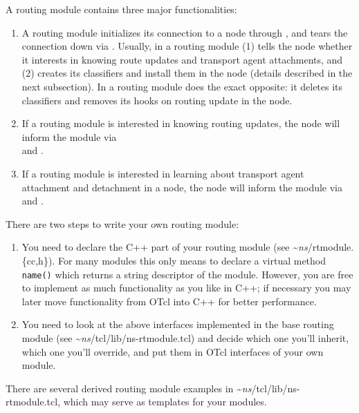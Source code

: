 A routing module contains three major functionalities:
\begin{enumerate}
\item %
  A routing module initializes its connection to a node through
  , and tears the connection down via
  .
  Usually, in  a routing module (1) tells the node
  whether it
  interests in knowing route updates and transport agent attachments,
  and (2) creates its classifiers and install them in the node
  (details described in the next subsection).
  In  a routing module does the exact opposite: it
  deletes its classifiers and removes its hooks on routing update in
  the node.
\item %
  If a routing module is interested in knowing routing updates, the
  node will inform the module via \\
   and
  .
\item %
  If a routing module is interested in learning about transport agent
  attachment and detachment in a node, the node will inform the module
  via \\ 
   and
  .
\end{enumerate}

There are two steps to write your own routing module:
\begin{enumerate}
\item You need to declare the C++ part of your routing
  module (see \textasciitilde\emph{ns}/{rtmodule.\{cc,h\}}). For many modules this only
  means to declare a virtual method {\tt name()} which returns a
  string descriptor of the module. However, you are free to implement
  as much functionality as you like in C++; if necessary you may
  later move functionality from OTcl into C++ for better performance. 
\item You need to look at the above interfaces implemented in the base
  routing module (see \textasciitilde\emph{ns}/{tcl/lib/ns-rtmodule.tcl}) and decide which
  one you'll inherit, which one you'll override, and put them in OTcl
  interfaces of your own module. 
\end{enumerate}
There are several derived routing module examples in
\textasciitilde\emph{ns}/{tcl/lib/ns-rtmodule.tcl}, which may serve as templates for your
modules.

